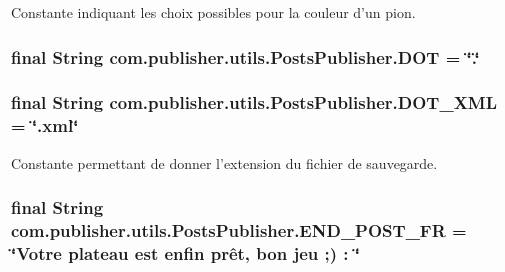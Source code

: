 Constante indiquant les choix possibles pour la couleur d'un pion. \hypertarget{interfacecom_1_1publisher_1_1utils_1_1PostsPublisher_a661d60220f5109d8469252bd9d636946}{
\subsubsection[{D\-O\-T}]{\setlength{\rightskip}{0pt plus 5cm}final String com.\-publisher.\-utils.\-Posts\-Publisher.\-D\-O\-T = \char`\"{}.\char`\"{}\hspace{0.3cm}{\ttfamily [static]}}}\label{interfacecom_1_1publisher_1_1utils_1_1PostsPublisher_a661d60220f5109d8469252bd9d636946}
\hypertarget{interfacecom_1_1publisher_1_1utils_1_1PostsPublisher_ac17a7c83a2ad79c31423731cf59c0818}{
\subsubsection[{D\-O\-T\-\_\-\-X\-M\-L}]{\setlength{\rightskip}{0pt plus 5cm}final String com.\-publisher.\-utils.\-Posts\-Publisher.\-D\-O\-T\-\_\-\-X\-M\-L = \char`\"{}.xml\char`\"{}\hspace{0.3cm}{\ttfamily [static]}}}\label{interfacecom_1_1publisher_1_1utils_1_1PostsPublisher_ac17a7c83a2ad79c31423731cf59c0818}
Constante permettant de donner l'extension du fichier de sauvegarde. \hypertarget{interfacecom_1_1publisher_1_1utils_1_1PostsPublisher_a86d6de5d7aa158041f7f40e688bf7d16}{
\subsubsection[{E\-N\-D\-\_\-\-P\-O\-S\-T\-\_\-\-F\-R}]{\setlength{\rightskip}{0pt plus 5cm}final String com.\-publisher.\-utils.\-Posts\-Publisher.\-E\-N\-D\-\_\-\-P\-O\-S\-T\-\_\-\-F\-R = \char`\"{}Votre plateau est enfin prêt, bon jeu ;) \-: \char`\"{}\hspace{0.3cm}{\ttfamily [static]}}}\label{interfacecom_1_1publisher_1_1utils_1_1PostsPublisher_a86d6de5d7aa158041f7f40e688bf7d16}
